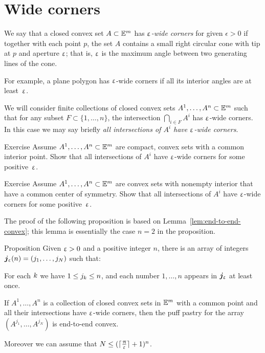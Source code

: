 \section{Wide corners}

We say that a closed convex set $A\subset \EE^m$ has  \emph{$\upvarepsilon$-wide corners}\label{page:wide corners} for given $\epsilon >0$ 
if together with each point $p$, 
the set $A$ contains a small right circular cone
with tip at $p$ and aperture $\upvarepsilon$;
that is, $\upvarepsilon$ is the maximum angle between two generating lines of the cone.

For example, 
a plane polygon 
has $\upvarepsilon$-wide corners
if all its interior angles are at least~$\upvarepsilon$.

We will consider finite collections of closed convex sets 
$A^1,\dots,A^n\subset\EE^m$ 
such that for any subset $F\subset\{1,\dots,n\}$,
the intersection
$\bigcap_{i\in F}A^i$ 
has $\upvarepsilon$-wide corners.
In this case we may say briefly \emph{all intersections of $A^i$ have $\upvarepsilon$-wide corners}.


\begin{thm}{Exercise}\label{ex:compact-walls}
Assume $A^1,\dots,A^n\subset\EE^m$ are compact, convex sets with a common interior point.
Show that all intersections of $A^i$ have $\upvarepsilon$-wide corners for some positive~$\upvarepsilon$.
\end{thm}

\begin{thm}{Exercise}\label{ex:centrally-simmetric-walls}
Assume $A^1,\dots,A^n\subset\EE^m$ are
convex sets with nonempty interior that have a common center of symmetry.
Show that all intersections of $A^i$ have $\upvarepsilon$-wide corners for some positive~$\upvarepsilon$.
\end{thm}

The proof of the following proposition is based on Lemma~\ref{lem:end-to-end-convex};
this lemma is essentially the case $n=2$ in the proposition.

\begin{thm}{Proposition}\label{prop:end-to-end-convex}
Given $\upvarepsilon>0$ and a positive integer $n$, 
there is an array of integers $\bm{j}_\eps(n)=(j_1,\dots,j_N)$ 
such that: 

\begin{subthm}{} For each $k$ we have $1\le j_\kay\le n$,
and each number $1,\dots,n$ appears in $\bm{j}_\upvarepsilon$ at least once.
\end{subthm}

\begin{subthm}{}
If $A^1,\dots,A^n$ is a collection of closed convex sets in $\mathbb{E}^m$ with a common point 
and all their intersections have $\upvarepsilon$-wide corners,  
then the puff pastry for the array
$(A^{j_1},\dots,A^{j_N})$ is end-to-end convex.
\end{subthm}

Moreover we can assume that $N\le (\lceil\tfrac\pi\eps\rceil+1)^n$.
\end{thm}

